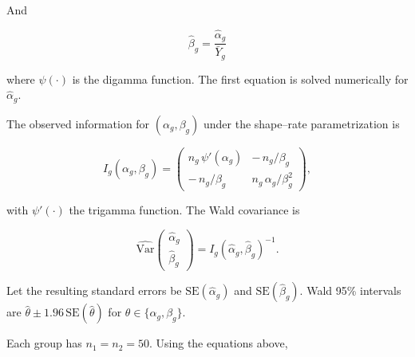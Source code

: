 \documentclass[
]{article}
\begin{document}
And

\[
 \hat\beta_g=\dfrac{\hat\alpha_g}{\bar Y_g}
\]

where \(\psi(\cdot)\) is the digamma function. The first equation is
solved numerically for \(\hat\alpha_g\).

The observed information for \((\alpha_g,\beta_g)\) under the
shape--rate parametrization is

\[
I_g(\alpha_g,\beta_g)=
\begin{pmatrix}
n_g\,\psi'(\alpha_g) & -\,n_g/\beta_g\\[4pt]
-\,n_g/\beta_g & n_g\,\alpha_g/\beta_g^2
\end{pmatrix},
\]

with \(\psi'(\cdot)\) the trigamma function. The Wald covariance is

\[
\widehat{\mathrm{Var}}\!\begin{pmatrix}\hat\alpha_g\\ \hat\beta_g\end{pmatrix}
= I_g(\hat\alpha_g,\hat\beta_g)^{-1}.
\]

Let the resulting standard errors be \(\text{SE}(\hat\alpha_g)\) and
\(\text{SE}(\hat\beta_g)\). Wald 95\% intervals are
\(\hat\theta \pm 1.96\,\text{SE}(\hat\theta)\) for
\(\theta\in\{\alpha_g,\beta_g\}\).

\newpage

Each group has \(n_1=n_2=50\). Using the equations above,
\end{document}

